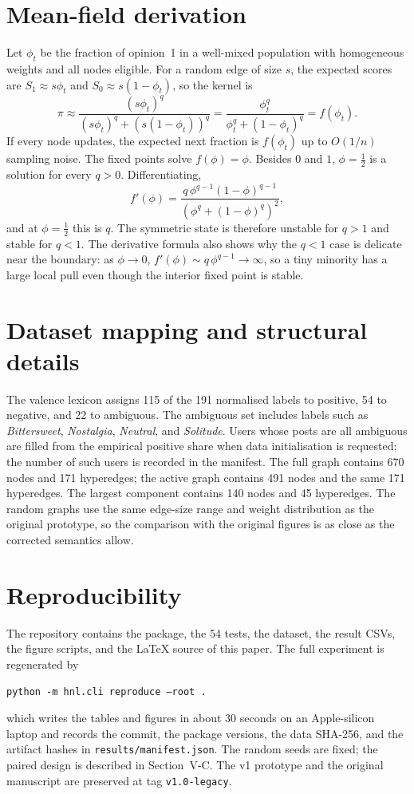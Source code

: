 \documentclass[conference]{IEEEtran}
\begin{document}
\section{Mean-field derivation}
Let $\phi_t$ be the fraction of opinion~1 in a well-mixed population with homogeneous weights and all nodes eligible. For a random edge of size $s$, the expected scores are $S_1\approx s\phi_t$ and $S_0\approx s(1-\phi_t)$, so the kernel is
\begin{equation}
\pi\approx\frac{(s\phi_t)^{q}}{(s\phi_t)^{q}+(s(1-\phi_t))^{q}}
=\frac{\phi_t^{q}}{\phi_t^{q}+(1-\phi_t)^{q}}=f(\phi_t).
\end{equation}
If every node updates, the expected next fraction is $f(\phi_t)$ up to $O(1/n)$ sampling noise. The fixed points solve $f(\phi)=\phi$. Besides $0$ and $1$, $\phi=\tfrac12$ is a solution for every $q>0$. Differentiating,
\begin{equation}
f'(\phi)=\frac{q\,\phi^{q-1}(1-\phi)^{q-1}}{(\phi^{q}+(1-\phi)^{q})^{2}},
\end{equation}
and at $\phi=\tfrac12$ this is $q$. The symmetric state is therefore unstable for $q>1$ and stable for $q<1$. The derivative formula also shows why the $q<1$ case is delicate near the boundary: as $\phi\to0$, $f'(\phi)\sim q\,\phi^{q-1}\to\infty$, so a tiny minority has a large local pull even though the interior fixed point is stable.

\section{Dataset mapping and structural details}
The valence lexicon assigns 115 of the 191 normalised labels to positive, 54 to negative, and 22 to ambiguous. The ambiguous set includes labels such as \emph{Bittersweet}, \emph{Nostalgia}, \emph{Neutral}, and \emph{Solitude}. Users whose posts are all ambiguous are filled from the empirical positive share when data initialisation is requested; the number of such users is recorded in the manifest. The full graph contains 670 nodes and 171 hyperedges; the active graph contains 491 nodes and the same 171 hyperedges. The largest component contains 140 nodes and 45 hyperedges. The random graphs use the same edge-size range and weight distribution as the original prototype, so the comparison with the original figures is as close as the corrected semantics allow.

\section{Reproducibility}
The repository contains the package, the 54 tests, the dataset, the result CSVs, the figure scripts, and the LaTeX source of this paper. The full experiment is regenerated by
\begin{center}
\texttt{python -m hnl.cli reproduce --root .}
\end{center}
which writes the tables and figures in about 30 seconds on an Apple-silicon laptop and records the commit, the package versions, the data SHA-256, and the artifact hashes in \texttt{results/manifest.json}. The random seeds are fixed; the paired design is described in Section~V-C. The v1 prototype and the original manuscript are preserved at tag \texttt{v1.0-legacy}.



\end{document}
